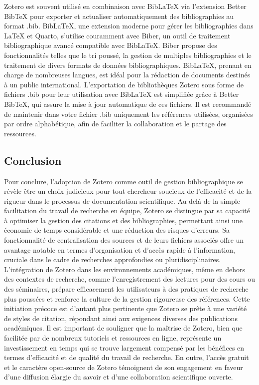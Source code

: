 \documentclass[
  letterpaper,
  DIV=11,
  numbers=noendperiod]{scrreprt}
\begin{document}
Zotero est souvent utilisé en combinaison avec BibLaTeX via l'extension
Better BibTeX pour exporter et actualiser automatiquement des
bibliographies au format .bib. BibLaTeX, une extension moderne pour
gérer les bibliographies dans LaTeX et Quarto, s'utilise couramment avec
Biber, un outil de traitement bibliographique avancé compatible avec
BibLaTeX. Biber propose des fonctionnalités telles que le tri poussé, la
gestion de multiples bibliographies et le traitement de divers formats
de données bibliographiques. BibLaTeX, prenant en charge de nombreuses
langues, est idéal pour la rédaction de documents destinés à un public
international. L'exportation de bibliothèques Zotero sous forme de
fichiers .bib pour leur utilisation avec BibLaTeX est simplifiée grâce à
Better BibTeX, qui assure la mise à jour automatique de ces fichiers. Il
est recommandé de maintenir dans votre fichier .bib uniquement les
références utilisées, organisées par ordre alphabétique, afin de
faciliter la collaboration et le partage des ressources.

\subsection{Conclusion}\label{conclusion-5}

Pour conclure, l'adoption de Zotero comme outil de gestion
bibliographique se révèle être un choix judicieux pour tout chercheur
soucieux de l'efficacité et de la rigueur dans le processus de
documentation scientifique. Au-delà de la simple facilitation du travail
de recherche en équipe, Zotero se distingue par sa capacité à optimiser
la gestion des citations et des bibliographies, permettant ainsi une
économie de temps considérable et une réduction des risques d'erreurs.
Sa fonctionnalité de centralisation des sources et de leurs fichiers
associés offre un avantage notable en termes d'organisation et d'accès
rapide à l'information, cruciale dans le cadre de recherches
approfondies ou pluridisciplinaires. L'intégration de Zotero dans les
environnements académiques, même en dehors des contextes de recherche,
comme l'enregistrement des lectures pour des cours ou des séminaires,
prépare efficacement les utilisateurs à des pratiques de recherche plus
poussées et renforce la culture de la gestion rigoureuse des références.
Cette initiation précoce est d'autant plus pertinente que Zotero se
prête à une variété de styles de citation, répondant ainsi aux exigences
diverses des publications académiques. Il est important de souligner que
la maîtrise de Zotero, bien que facilitée par de nombreux tutoriels et
ressources en ligne, représente un investissement en temps qui se trouve
largement compensé par les bénéfices en termes d'efficacité et de
qualité du travail de recherche. En outre, l'accès gratuit et le
caractère open-source de Zotero témoignent de son engagement en faveur
d'une diffusion élargie du savoir et d'une collaboration scientifique
ouverte.
\end{document}

